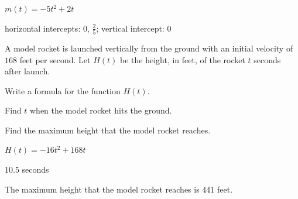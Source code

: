 \begin{exercise}\label{exercise-3.2.12}
$m(t)=-5t^2+2t$
\end{exercise}

\begin{solution}
horizontal intercepts: $0$, $\frac{2}{5}$; vertical intercept: $0$    
\end{solution}








\begin{exercise}
A model rocket is launched vertically from the ground with an initial velocity of $168$ feet per second. Let $H(t)$ be the height, in feet, of the rocket $t$ seconds after launch.

    \begin{parts}
        \item Write a formula for the function $H(t)$. 

        \item Find $t$ when the model rocket hits the ground.

        \item Find the maximum height that the model rocket reaches.
    \end{parts}

\end{exercise}

\begin{solution}
    \begin{parts}
        \item $H(t)=-16t^2+168t$
        \item $10.5$ seconds
        \item The maximum height that the model rocket reaches is $441$ feet.
    \end{parts}
\end{solution}